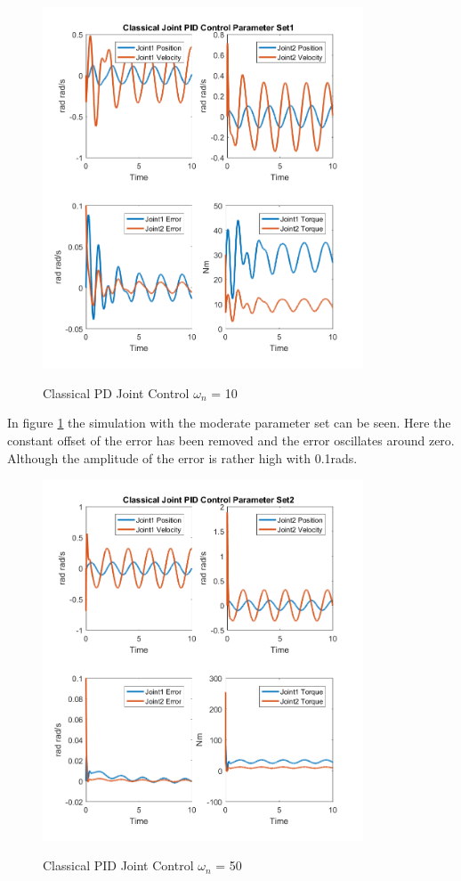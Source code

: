 \begin{figure}[h]
	\centering
	\includegraphics[width=0.85\textwidth]{pics/ClassicalJointPIDControlParameterSet1.png}\\
	\caption{Classical PD Joint Control $\omega_n$ = 10}
	\label{fig:ch3_sim31}
\end{figure}

In figure \ref{fig:ch3_sim31} the simulation with the moderate parameter set can be seen. Here the constant offset of the error has been removed and the error oscillates around zero. Although the amplitude of the error is rather high with 0.1rads.
\begin{figure}[h]
	\centering
	\includegraphics[width=0.85\textwidth]{pics/ClassicalJointPIDControlParameterSet2.png}\\
	\caption{Classical PID Joint Control $\omega_n$ = 50}
	\label{fig:ch3_sim32}
\end{figure}

